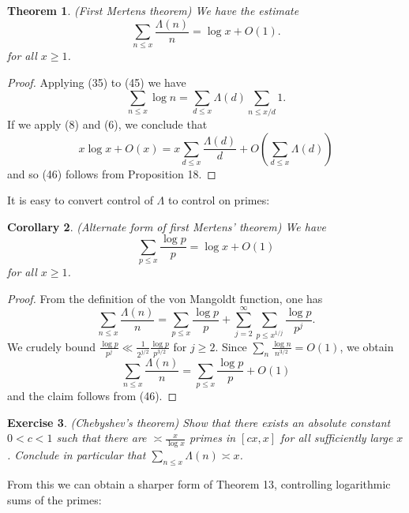 \documentclass[10pt,reqno]{amsart}
\newtheorem{theorem}{Theorem}
\newtheorem{corollary}[theorem]{Corollary}
\newtheorem{exercise}[theorem]{Exercise}
\begin{document}
\begin{theorem} (First Mertens theorem) We have the estimate
    \begin{equation}   \sum_{n \leq x} \frac{\Lambda(n)}{n} = \log x + O(1). \end{equation}
    for all $x \geq 1$.
\end{theorem}

\begin{proof}
    Applying (35) to (45) we have
    \begin{equation}   \sum_{n \leq x} \log n = \sum_{d \leq x} \Lambda(d) \sum_{n \leq x/d} 1. \end{equation}
    If we apply (8) and (6), we conclude that
    \begin{equation}   x\log x + O(x) = x\sum_{d \leq x} \frac{\Lambda(d)}{d} + O( \sum_{d \leq x} \Lambda(d) ) \end{equation}
    and so (46) follows from Proposition 18. %
\end{proof}

It is easy to convert control of $\Lambda$ to control on primes:

\begin{corollary}
    (Alternate form of first Mertens’ theorem) We have
    \[  \sum_{p \leq x} \frac{\log p}{p} = \log x + O(1)\]
    for all $x \geq 1$.
\end{corollary}
\begin{proof}
    From the definition of the von Mangoldt function, one has
    \[  \sum_{n \leq x} \frac{\Lambda(n)}{n} = \sum_{p \leq x} \frac{\log p}{p} + \sum_{j=2}^\infty \sum_{p \leq x^{1/j}} \frac{\log p}{p^j}.\]
    We crudely bound $\frac{\log p}{p^j} \ll \frac{1}{2^{j/2}} \frac{\log p}{p^{3/2}}$ for $j \geq 2$. Since $\sum_n \frac{\log n}{n^{3/2}} = O(1)$, we obtain
    \[  \sum_{n \leq x} \frac{\Lambda(n)}{n} = \sum_{p \leq x} \frac{\log p}{p} + O(1)\]
    and the claim follows from (46). %
\end{proof}

\begin{exercise} (Chebyshev’s theorem) Show that there exists an absolute constant $0 < c < 1$ such that there are $\asymp \frac{x}{\log x}$ primes in $[cx,x]$ for all sufficiently large $x$. Conclude in particular that $\sum_{n \leq x} \Lambda(n) \asymp x$.
\end{exercise}

From this we can obtain a sharper form of Theorem 13, controlling logarithmic sums of the primes:
\end{document}
